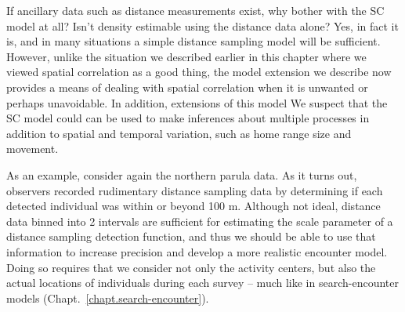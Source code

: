 If ancillary data such as distance measurements exist, why
bother with the SC model at all?
Isn't density estimable
using the distance data alone? Yes, in fact it is, and in many situations a
simple distance sampling model will be sufficient. However, unlike the
situation we described earlier in this chapter where we viewed spatial
correlation as a good thing, the model extension we describe now
provides a means of dealing with spatial correlation when it is
unwanted or perhaps unavoidable.
In addition, extensions of this model
We suspect that the SC model could
can be used to make inferences about multiple processes in addition to
spatial and temporal variation, such as home range size and movement.

As an example, consider again the northern parula data.
As it turns out, %
observers recorded rudimentary distance sampling data by determining
if each detected
individual was within or beyond 100 m. Although not ideal, distance
data binned into 2 intervals are sufficient for estimating the scale
parameter of a distance sampling detection function, and thus we
should be able to use that information to increase precision
and
develop a more realistic encounter model. %
Doing so requires that we consider not only the activity centers,
but also the actual locations of individuals during each survey --
much like in search-encounter models
(Chapt.~\ref{chapt.search-encounter}). %

